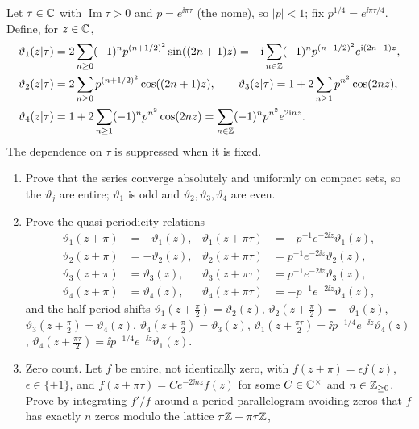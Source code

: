 \begin{exercise}
Let $\tau\in\mathbb C$ with $\operatorname{Im}\tau>0$ and $p=e^{\ii\pi\tau}$ (the
nome), so $|p|<1$; fix $p^{1/4}=e^{\ii\pi\tau/4}$.  Define, for $z\in\mathbb C$,
\begin{align*}
 \vartheta_1(z|\tau)&=2\sum_{n\ge0}(-1)^np^{(n+1/2)^2}\sin((2n+1)z)
 =-\mathrm i\sum_{n\in\mathbb Z}(-1)^np^{(n+1/2)^2}e^{\mathrm i(2n+1)z},\\
 \vartheta_2(z|\tau)&=2\sum_{n\ge0}p^{(n+1/2)^2}\cos((2n+1)z),\qquad
 \vartheta_3(z|\tau)=1+2\sum_{n\ge1}p^{n^2}\cos(2nz),\\
 \vartheta_4(z|\tau)&=1+2\sum_{n\ge1}(-1)^np^{n^2}\cos(2nz)=\sum_{n\in\mathbb Z}(-1)^np^{n^2}e^{2\mathrm i nz}.
\end{align*}
The dependence on $\tau$ is suppressed when it is fixed.
\begin{enumerate}[label=(\alph*)]
\item Prove that the series converge absolutely and uniformly on compact
sets, so the $\vartheta_j$ are entire; $\vartheta_1$ is odd and
$\vartheta_2,\vartheta_3,\vartheta_4$ are even.
\item Prove the quasi-periodicity relations
\begin{align*}
 \vartheta_1(z+\pi)&=-\vartheta_1(z),&\vartheta_1(z+\pi\tau)&=-p^{-1}e^{-2\ii z}\vartheta_1(z),\\
 \vartheta_2(z+\pi)&=-\vartheta_2(z),&\vartheta_2(z+\pi\tau)&=p^{-1}e^{-2\ii z}\vartheta_2(z),\\
 \vartheta_3(z+\pi)&=\vartheta_3(z),&\vartheta_3(z+\pi\tau)&=p^{-1}e^{-2\ii z}\vartheta_3(z),\\
 \vartheta_4(z+\pi)&=\vartheta_4(z),&\vartheta_4(z+\pi\tau)&=-p^{-1}e^{-2\ii z}\vartheta_4(z),
\end{align*}
and the half-period shifts
$\vartheta_1(z+\tfrac\pi2)=\vartheta_2(z)$, $\vartheta_2(z+\tfrac\pi2)=-\vartheta_1(z)$,
$\vartheta_3(z+\tfrac\pi2)=\vartheta_4(z)$, $\vartheta_4(z+\tfrac\pi2)=\vartheta_3(z)$,
$\vartheta_1(z+\tfrac{\pi\tau}2)=\ii p^{-1/4}e^{-\ii z}\vartheta_4(z)$,
$\vartheta_4(z+\tfrac{\pi\tau}2)=\ii p^{-1/4}e^{-\ii z}\vartheta_1(z)$.
\item Zero count.  Let $f$ be entire, not identically zero, with
$f(z+\pi)=\epsilon f(z)$, $\epsilon\in\{\pm1\}$, and
$f(z+\pi\tau)=Ce^{-2\ii nz}f(z)$ for some $C\in\mathbb C^\times$ and $n\in\mathbb Z_{\ge0}$.
Prove by integrating $f'/f$ around a period parallelogram avoiding zeros
that $f$ has exactly $n$ zeros modulo the lattice $\pi\mathbb Z+\pi\tau\mathbb Z$,

\end{enumerate}
\end{exercise}
